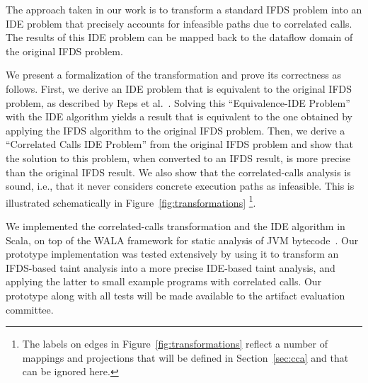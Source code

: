 

The approach taken in our work is to transform a standard IFDS problem into an
IDE problem that precisely accounts for infeasible paths due to correlated calls. 
The results of this IDE problem can be mapped back to the dataflow domain of the 
original IFDS problem.

We present a formalization of the transformation and prove its correctness
as follows. 
First, we derive an IDE problem that is equivalent to the original IFDS problem,
as described by Reps et al.~\cite{sagiv1996precise}.
Solving this ``Equivalence-IDE Problem'' with the IDE algorithm yields a result that
is equivalent to the one obtained by applying the IFDS algorithm to the original IFDS problem.
Then, we derive a ``Correlated Calls 
IDE Problem'' from the original IFDS problem and show 
that the solution to this problem, when converted to an IFDS result, is more precise
than the original IFDS result.
We also show that the correlated-calls analysis is sound, i.e., that it never considers concrete execution paths as infeasible.
This is illustrated schematically
in Figure~\ref{fig:transformations}%
\footnote{ 
  The labels %
  on edges in 
  Figure~\ref{fig:transformations} reflect a number of mappings and projections 
  that will be defined in Section~\ref{sec:cca} and that can be ignored here.
}.

We implemented the correlated-calls transformation and the IDE algorithm in Scala,
on top of the WALA framework for static analysis of JVM bytecode~\cite{fink2012wala}.
Our prototype implementation was tested extensively by using it to transform an IFDS-based 
taint analysis into a more precise IDE-based taint analysis, and applying the latter
to small example programs with correlated calls. Our prototype along with all tests
will be made available to the artifact evaluation committee.

%

